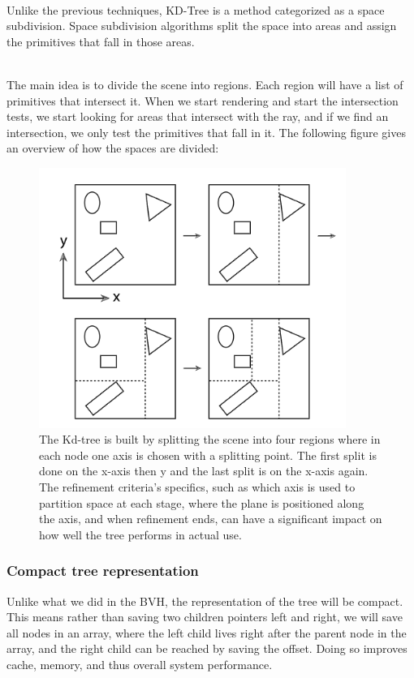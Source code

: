 \documentclass[11pt,a4paper]{article}
\begin{document}
\noindent
\\
Unlike the previous techniques, KD-Tree is a method categorized as a space subdivision.
Space subdivision algorithms split the space into areas and assign the primitives that fall in those areas.

\noindent
\\
The main idea is to divide the scene into regions. Each region will have a list of primitives that intersect it. When we start rendering and start the intersection tests, we start looking for areas that intersect with the ray, and if we find an intersection, we only test the primitives that fall in it.
The following figure gives an overview of how the spaces are divided: 

\begin{figure}[h]	
     \centering
     \captionsetup{justification=centering,margin=2cm}
     \includegraphics[width=10cm]{images/kdtree/example_demo.png}
     \caption{The Kd-tree is built by splitting the scene into four regions where in each node one axis is chosen with a splitting point.  The first split is done on the x-axis then y and the last split is on the x-axis again. The refinement criteria's specifics, such as which axis is used to partition space at each stage, where the plane is positioned along the axis, and when refinement ends, can have a significant impact on how well the tree performs in actual use. \protect\cite{Pharr2016}}
        \label{fig:dice}
\end{figure}



\subsubsection{Compact tree representation}
Unlike what we did in the BVH, the representation of the tree will be compact. This means rather than saving two children pointers left and right, we will save all nodes in an array, where the left child lives right after the parent node in the array, and the right child can be reached by saving the offset. Doing so improves cache, memory, and thus overall system performance.
\end{document}
